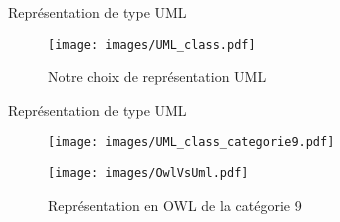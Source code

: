 \begin{frame}{Représentation de type UML}
\begin{figure}
	  \centering
	  \texttt{[image: images/UML\_class.pdf]}
	  \caption{Notre choix de représentation UML}
\end{figure}
\end{frame}


\begin{frame}{Représentation de type UML}
\begin{figure}
	  \centering
	  \texttt{[image: images/UML\_class\_categorie9.pdf]}
	  \caption{Représentation de type UML de la catégorie 9}
	  \texttt{[image: images/OwlVsUml.pdf]}
	  \caption{Représentation en OWL de la catégorie 9} 
\end{figure}
\end{frame}

